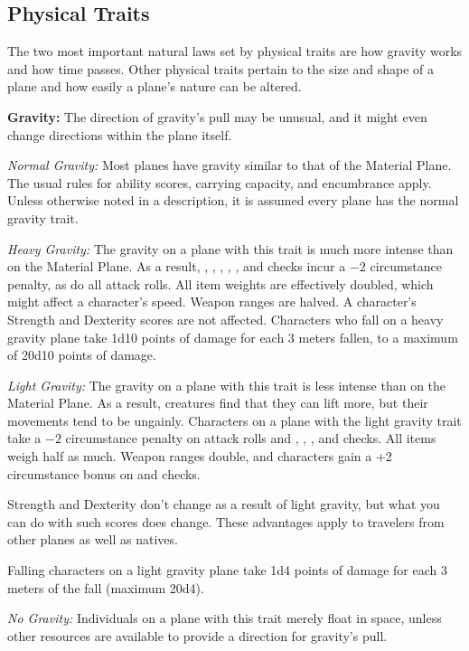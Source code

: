 \subsection{Physical Traits}
The two most important natural laws set by physical traits are how gravity works and how time passes. Other physical traits pertain to the size and shape of a plane and how easily a plane's nature can be altered.

\textbf{Gravity:} The direction of gravity's pull may be unusual, and it might even change directions within the plane itself.

\textit{Normal Gravity:} Most planes have gravity similar to that of the Material Plane. The usual rules for ability scores, carrying capacity, and encumbrance apply. Unless otherwise noted in a description, it is assumed every plane has the normal gravity trait.

\textit{Heavy Gravity:} The gravity on a plane with this trait is much more intense than on the Material Plane. As a result, , , , , , and  checks incur a $-2$ circumstance penalty, as do all attack rolls. All item weights are effectively doubled, which might affect a character's speed. Weapon ranges are halved. A character's Strength and Dexterity scores are not affected. Characters who fall on a heavy gravity plane take 1d10 points of damage for each 3 meters fallen, to a maximum of 20d10 points of damage.

\textit{Light Gravity:} The gravity on a plane with this trait is less intense than on the Material Plane. As a result, creatures find that they can lift more, but their movements tend to be ungainly. Characters on a plane with the light gravity trait take a $-2$ circumstance penalty on attack rolls and , , , and  checks. All items weigh half as much. Weapon ranges double, and characters gain a +2 circumstance bonus on  and  checks.

Strength and Dexterity don't change as a result of light gravity, but what you can do with such scores does change. These advantages apply to travelers from other planes as well as natives.

Falling characters on a light gravity plane take 1d4 points of damage for each 3 meters of the fall (maximum 20d4).

\textit{No Gravity:} Individuals on a plane with this trait merely float in space, unless other resources are available to provide a direction for gravity's pull.

